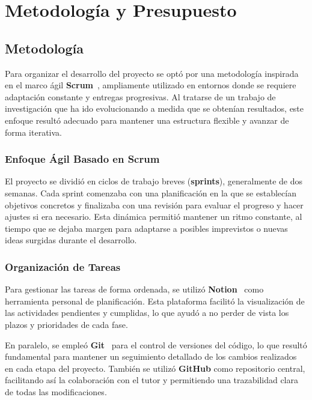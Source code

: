 
\chapter{Metodología y Presupuesto}\label{ch:metodologia-y-presupuesto}
\section{Metodología}\label{sec:metodologia}
Para organizar el desarrollo del proyecto se optó por una metodología inspirada en el marco ágil
\textbf{Scrum}~\cite{ScrumGuide}, ampliamente utilizado en entornos donde se requiere adaptación constante y
entregas progresivas.
Al tratarse de un trabajo de investigación que ha ido evolucionando a medida que se obtenían resultados, este enfoque
resultó adecuado para mantener una estructura flexible y avanzar de forma iterativa.

\subsection{Enfoque Ágil Basado en Scrum}\label{subsec:enfoque-agil-basado-en-scrum}
El proyecto se dividió en ciclos de trabajo breves (\textbf{sprints}), generalmente de dos semanas.
Cada sprint comenzaba con una planificación en la que se establecían objetivos concretos y finalizaba con una revisión
para evaluar el progreso y hacer ajustes si era necesario.
Esta dinámica permitió mantener un ritmo constante, al tiempo que se dejaba margen para adaptarse a posibles
imprevistos o nuevas ideas surgidas durante el desarrollo.

\subsection{Organización de Tareas}\label{subsec:organizacion-de-tareas}
Para gestionar las tareas de forma ordenada, se utilizó \textbf{Notion}~\cite{NotionGestionTareas} como herramienta
personal de planificación.
Esta plataforma facilitó la visualización de las actividades pendientes y cumplidas, lo que ayudó a no perder de vista
los plazos y prioridades de cada fase.


En paralelo, se empleó \textbf{Git}~\cite{chaconProGit2014} para el control de versiones del código, lo que resultó
fundamental para mantener un seguimiento detallado de los cambios realizados en cada etapa del proyecto.
También se utilizó \textbf{GitHub} como repositorio central, facilitando así la colaboración con el tutor y permitiendo
una trazabilidad clara de todas las modificaciones.


